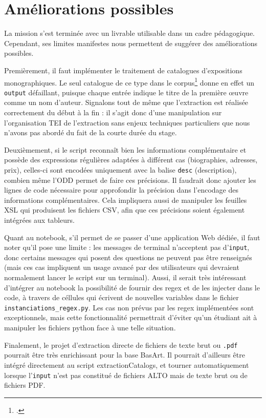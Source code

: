 \documentclass[a4paper,12pt,twoside]{book}
\begin{document}
\section{Améliorations possibles}

La mission s'est terminée avec un livrable utilisable dans un cadre pédagogique. Cependant, ses limites manifestes nous permettent de suggérer des améliorations possibles.  

Premièrement, il faut implémenter le traitement de catalogues d'expositions monographiques. Le seul catalogue de ce type dans le corpus\footcite{castagnaryExpositionOeuvresGustave1882} donne en effet un \texttt{output} défaillant, puisque chaque entrée indique le titre de la première œuvre comme un nom d'auteur. Signalons tout de même que l'extraction est réalisée correctement du début à la fin : il s'agit donc d'une manipulation sur l'organisation TEI de l'extraction sans enjeux techniques particuliers que nous n'avons pas abordé du fait de la courte durée du stage. 

Deuxièmement, si le script reconnaît bien les informations complémentaire et possède des expressions régulières adaptées à différent cas (biographies, adresses, prix), celles-ci sont encodées uniquement avec la balise \texttt{desc} (description), combien même l'ODD permet de faire ces précisions. Il faudrait donc ajouter les lignes de code nécessaire pour approfondir la précision dans l'encodage des informations complémentaires. Cela impliquera aussi de manipuler les feuilles XSL qui produisent les fichiers CSV, afin que ces précisions soient également intégrées aux tableurs.

Quant au notebook, s'il permet de se passer d'une application Web dédiée, il faut noter qu'il pose une limite : les messages de terminal n'acceptent pas d'\texttt{input}, donc certains messages qui posent des questions ne peuvent pas être renseignés (mais ces cas impliquent un usage avancé par des utilisateurs qui devraient normalement lancer le script sur un terminal). Aussi, il serait très intéressant d'intégrer au notebook la possibilité de fournir des regex et de les injecter dans le code, à travers de céllules qui écrivent de nouvelles variables dans le fichier \texttt{instanciations\_regex.py}. Les cas non prévus par les regex implémentées sont exceptionnels, mais cette fonctionnalité permettrait d'éviter qu'un étudiant ait à manipuler les fichiers python face à une telle situation.

Finalement, le projet d'extraction directe de fichiers de texte brut ou \texttt{.pdf} pourrait être très enrichissant pour la base BasArt. Il pourrait d'ailleurs être intégré directement au script extractionCatalogs, et tourner automatiquement lorsque l'\texttt{input} n'est pas constitué de fichiers ALTO mais de texte brut ou de fichiers PDF.  
\end{document}
